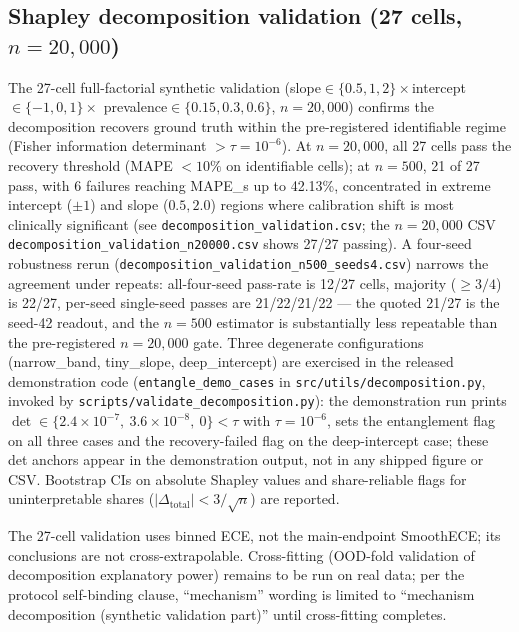 \documentclass[review,12pt,nonatbib]{elsarticle}
\begin{document}
\subsection{Shapley decomposition validation (27 cells, $n=20{,}000$)}
\label{sec:shapley}
The 27-cell full-factorial synthetic validation
(slope$\in\{0.5,1,2\}\times$intercept$\in\{-1,0,1\}\times$
prevalence$\in\{0.15,0.3,0.6\}$, $n=20{,}000$) confirms the
decomposition recovers ground truth within the pre-registered
identifiable regime (Fisher information determinant $>\tau=10^{-6}$).
At $n=20{,}000$, all 27 cells pass the recovery threshold (MAPE
$<10\%$ on identifiable cells); at $n=500$, 21 of 27 pass, with 6
failures reaching MAPE\_s up to 42.13\%, concentrated in extreme
intercept ($\pm 1$) and slope ($0.5, 2.0$) regions where calibration
shift is most clinically significant (see
\texttt{decomposition\_validation.csv}; the $n=20{,}000$ CSV
\texttt{decomposition\_validation\_}\allowbreak\texttt{n20000.csv}
shows 27/27 passing). A four-seed robustness rerun
(\texttt{decomposition\_validation\_n500\_seeds4.csv}) narrows the
agreement under repeats: all-four-seed pass-rate is 12/27 cells,
majority ($\geq 3/4$) is 22/27, per-seed single-seed passes are
21/22/21/22 --- the quoted 21/27 is the seed-42 readout, and the
$n=500$ estimator is substantially less repeatable than the
pre-registered $n=20{,}000$ gate. Three degenerate configurations
(narrow\_band, tiny\_slope, deep\_intercept) are exercised in the
released demonstration code (\texttt{entangle\_demo\_cases} in
\texttt{src/utils/decomposition.py}, invoked by
\texttt{scripts/validate\_decomposition.py}): the demonstration run
prints $\det\in\{2.4\times10^{-7},\ 3.6\times10^{-8},\ 0\}<\tau$ with
$\tau=10^{-6}$, sets the entanglement flag on all three cases and the
recovery-failed flag on the deep-intercept case; these det anchors
appear in the demonstration output, not in any shipped figure or CSV.
Bootstrap CIs on absolute Shapley values and share-reliable
flags for uninterpretable shares ($|\Delta_{\text{total}}|<3/\sqrt{n}$)
are reported.

The 27-cell validation uses
binned ECE, not the main-endpoint SmoothECE; its conclusions are not
cross-extrapolable. Cross-fitting (OOD-fold validation of
decomposition explanatory power) remains to be run on real data; per
the protocol self-binding clause, ``mechanism'' wording is limited to
``mechanism decomposition (synthetic validation part)'' until
cross-fitting completes.
\end{document}
